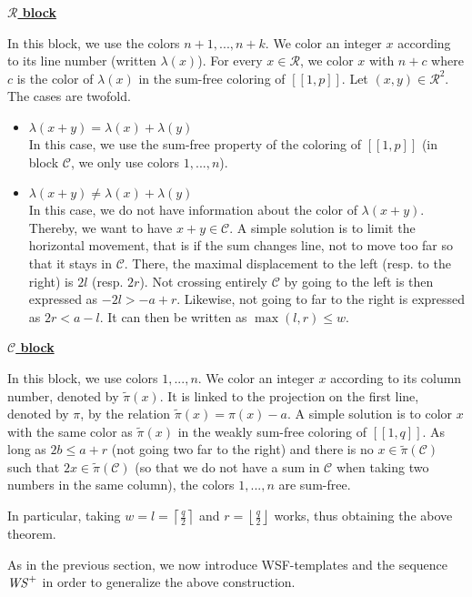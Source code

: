 \noindent \underline{\textbf{\(\mathcal{R}\) block}}
\par
In this block,  we use the colors \(n + 1, ..., n + k\). We color an integer \(x\) according to its line number (written \(\lambda(x)\)).
For every \(x \in \mathcal{R}\), we color \(x\) with \(n + c\) where \(c\) is the color of \(\lambda(x)\) in the sum-free coloring of  \([\![1,p]\!]\).
Let \((x, y) \in \mathcal{R}^2\). The cases are twofold.

\begin{itemize}
	\item \underline{\(\lambda(x+y) = \lambda(x) + \lambda(y)\)} \\
	In this case, we use the sum-free property of the coloring of \([\![1,p]\!]\) (in block \(\mathcal{C}\), we only use colors \(1, ..., n\)).

	\item \underline{\(\lambda(x+y) \neq \lambda(x) + \lambda(y)\)} \\
	In this case, we do not have information about the color of \(\lambda(x+y)\). Thereby, we want to have \(x+y \in \mathcal{C}\).
	A simple solution is to limit the horizontal movement, that is if the sum changes line, not to move too far so that it stays in \(\mathcal{C}\).
	There, the maximal displacement to the left (resp. to the right) is \(2l\) (resp. \(2r\)). Not crossing entirely \(\mathcal{C}\) by going to the left
	is then expressed as \(-2l > -a + r\). Likewise, not going to far to the right is expressed as \(2r < a - l\). It can then be written as
	 \(\max(l, r) \leqslant w\).
\end{itemize}

\noindent \underline{\textbf{\(\mathcal{C}\) block}}
\par
In this block,  we use colors \(1, ..., n\). We color an integer \(x\) according to its column number, denoted by \(\tilde{\pi}(x)\). It is linked to the
projection on the first line, denoted by \(\pi\), by the relation \(\tilde{\pi}(x) = \pi(x) - a\). A simple solution is to color \(x\) with the same color
as \(\tilde{\pi}(x)\) in the weakly sum-free coloring of \([\![1,q]\!]\). As long as \(2b \leqslant a + r\) (not going two far to the right) and there
is no \(x \in \tilde{\pi}(\mathcal{C})\) such that \(2x \in \tilde{\pi}(\mathcal{C})\) (so that we do not have a sum in \(\mathcal{C}\) when
taking two numbers in the same column), the colors \(1, ..., n\) are sum-free.

In particular, taking \(w = l = \left\lceil \displaystyle \frac{q}{2} \right\rceil\) and \(r = \left\lfloor \displaystyle \frac{q}{2} \right\rfloor\) works, thus obtaining the above theorem.\\
\par
As in the previous section, we now introduce WSF-templates and the sequence \(\mathit{WS}^+\) in order to generalize the above construction.


